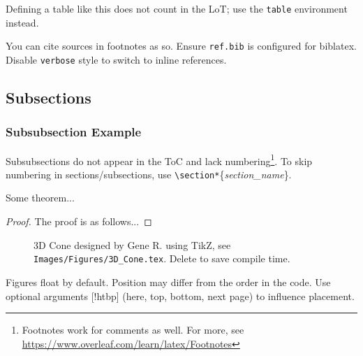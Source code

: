 \begin{remark}
Defining a table like this does not count in the LoT; use the \verb+table+ environment instead.
\end{remark}

\begin{remark}
You can cite sources in footnotes as so\autocite{golub}.  
Ensure \verb+ref.bib+ is configured for biblatex. Disable \texttt{verbose} style to switch to inline references.
\end{remark}

\newpage %

\subsection{Subsections}

\subsubsection{Subsubsection Example}

Subsubsections do not appear in the ToC and lack numbering\footnote{Footnotes work for comments as well. For more, see \url{https://www.overleaf.com/learn/latex/Footnotes}}.
To skip numbering in sections/subsections, use \verb+\section*+\{\textit{section\_name}\}.

\begin{theorem}\label{Th123}
Some theorem...
\end{theorem}

\begin{proof}
The proof is as follows...
\end{proof}

\begin{figure}[htbp]
\centering
\captionsetup{justification=centering}

\caption{3D Cone designed by Gene R. using TikZ, see \texttt{Images/Figures/3D\_Cone.tex}. Delete to save compile time.}
\end{figure}

\begin{remark}
Figures float by default. Position may differ from the order in the code. Use optional arguments [!htbp] (here, top, bottom, next page) to influence placement.
\end{remark}

